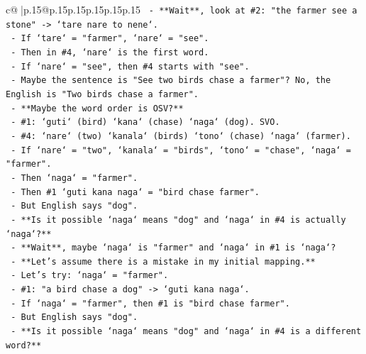 \documentclass{article}
\begin{document}
{\begin{supertabular}{c@{$\;$}|p{.15\linewidth}@{}p{.15\linewidth}p{.15\linewidth}p{.15\linewidth}p{.15\linewidth}p{.15\linewidth}}
{{{\texttt{                     {-} **Wait**, look at \#2: "the farmer see a stone" {-}> `tare nare to nene`.} \\
\texttt{                       {-} If `tare` = "farmer", `nare` = "see".} \\
\texttt{                       {-} Then in \#4, `nare` is the first word.} \\
\texttt{                       {-} If `nare` = "see", then \#4 starts with "see".} \\
\texttt{                       {-} Maybe the sentence is "See two birds chase a farmer"? No, the English is "Two birds chase a farmer".} \\
\texttt{                       {-} **Maybe the word order is OSV?**} \\
\texttt{                         {-} \#1: `guti` (bird) `kana` (chase) `naga` (dog). SVO.} \\
\texttt{                         {-} \#4: `nare` (two) `kanala` (birds) `tono` (chase) `naga` (farmer).} \\
\texttt{                         {-} If `nare` = "two", `kanala` = "birds", `tono` = "chase", `naga` = "farmer".} \\
\texttt{                         {-} Then `naga` = "farmer".} \\
\texttt{                         {-} Then \#1 `guti kana naga` = "bird chase farmer".} \\
\texttt{                         {-} But English says "dog".} \\
\texttt{                         {-} **Is it possible `naga` means "dog" and `naga` in \#4 is actually `naga`?**} \\
\texttt{                         {-} **Wait**, maybe `naga` is "farmer" and `naga` in \#1 is `naga`?} \\
\texttt{                         {-} **Let's assume there is a mistake in my initial mapping.**} \\
\texttt{                         {-} Let's try: `naga` = "farmer".} \\
\texttt{                           {-} \#1: "a bird chase a dog" {-}> `guti kana naga`.} \\
\texttt{                           {-} If `naga` = "farmer", then \#1 is "bird chase farmer".} \\
\texttt{                           {-} But English says "dog".} \\
\texttt{                           {-} **Is it possible `naga` means "dog" and `naga` in \#4 is a different word?**} \\
}}}
\end{supertabular}}
\end{document}

